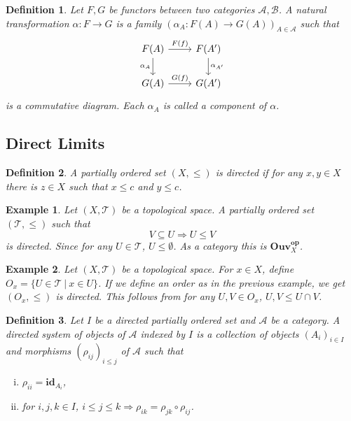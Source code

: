 \documentclass{article}
\newtheorem{definition}{Definition}[section]
\newtheorem{example}{Example}[section]
\numberwithin{equation}{section}
\begin{document}
\begin{definition}
Let $F,G$ be functors between two categories $\mathcal{A},\mathcal{B}$. A natural transformation $\alpha:F\to G$ is a family $(\alpha_A:F(A)\to G(A))_{A\in\mathcal{A}}$ such that 
\[ \begin{tikzcd}
F(A) \arrow{r}{F(f)} \arrow[swap]{d}{\alpha_A} & F(A') \arrow{d}{\alpha_{A'}} \\%
G(A) \arrow{r}{G(f)}& G(A')
\end{tikzcd}
\]
is a commutative diagram. Each $\alpha_A$ is called a component of $\alpha$. 
 \label{natural_transformation}
\end{definition}

\subsection{Direct Limits}

\begin{definition}
A partially ordered set $(X,\leq)$ is directed if for any $x,y\in X$ there is $z\in X$ such that $x\leq c$ and $y\leq c$.
\end{definition}

\begin{example}
Let $(X,\mathcal{T})$ be a topological space. A partially ordered set $(\mathcal{T},\leq)$ such that 
\begin{equation*}
V\subseteq U\Rightarrow U\leq V
\end{equation*}
is directed. Since for any $U\in\mathcal{T}$, $U\leq \emptyset$. As a category this is $\mathbf{Ouv}_X^{\mathbf{op}}$.
\end{example}

\begin{example}
\label{top_dir_cat}
Let $(X,\mathcal{T})$ be a topological space. For $x\in X$, define $O_x = \{U\in\mathcal{T}\:|\: x\in U\}$. If we define an order as in the previous example, we get $(O_x,\leq)$ is directed. This follows from for any $U,V\in O_x$, $U,V\leq U\cap V$.  
\end{example}

\begin{definition}
Let $I$ be a directed partially ordered set and $\mathcal{A}$ be a category. A directed system of objects of $\mathcal{A}$ indexed by $I$ is a collection of objects $(A_i)_{i\in I}$ and morphisms $(\rho_{ij})_{i\leq j}$ of $\mathcal{A}$ such that 
\begin{enumerate}[i).]
\item $\rho_{ii}=\mathbf{id}_{A_i}$,
\item for $i,j,k\in I$, $i\leq j \leq k \Rightarrow \rho_{ik} = \rho_{jk}\circ\rho_{ij}$.
\end{enumerate}
\end{definition}
\end{document}
